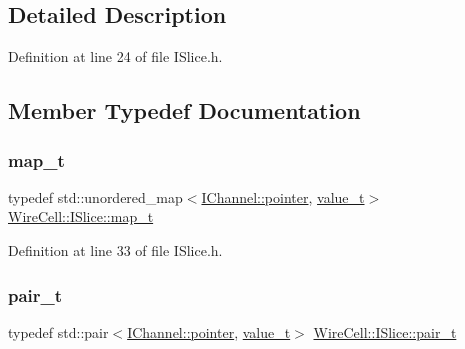 \subsection{Detailed Description}


Definition at line 24 of file I\+Slice.\+h.



\subsection{Member Typedef Documentation}
\mbox{\label{class_wire_cell_1_1_i_slice_ac953094751a404827468ca9887736415}} 
\subsubsection{\texorpdfstring{map\+\_\+t}{map\_t}}
{\footnotesize\ttfamily typedef std\+::unordered\+\_\+map$<$\hyperlink{class_wire_cell_1_1_i_data_aff870b3ae8333cf9265941eef62498bc}{I\+Channel\+::pointer}, \hyperlink{class_wire_cell_1_1_i_slice_a9d6f136d407740183a2c4d2078745a59}{value\+\_\+t}$>$ \hyperlink{class_wire_cell_1_1_i_slice_ac953094751a404827468ca9887736415}{Wire\+Cell\+::\+I\+Slice\+::map\+\_\+t}}



Definition at line 33 of file I\+Slice.\+h.

\mbox{\label{class_wire_cell_1_1_i_slice_a24ec24749afee0e5a3c4fd8e3e878789}} 
\subsubsection{\texorpdfstring{pair\+\_\+t}{pair\_t}}
{\footnotesize\ttfamily typedef std\+::pair$<$\hyperlink{class_wire_cell_1_1_i_data_aff870b3ae8333cf9265941eef62498bc}{I\+Channel\+::pointer}, \hyperlink{class_wire_cell_1_1_i_slice_a9d6f136d407740183a2c4d2078745a59}{value\+\_\+t}$>$ \hyperlink{class_wire_cell_1_1_i_slice_a24ec24749afee0e5a3c4fd8e3e878789}{Wire\+Cell\+::\+I\+Slice\+::pair\+\_\+t}}



